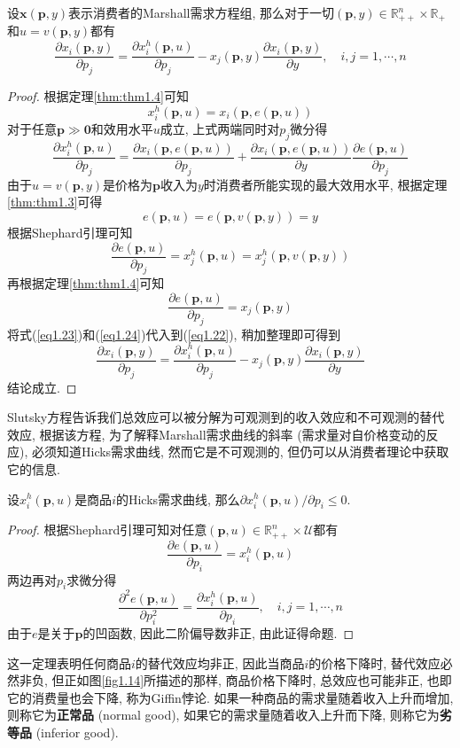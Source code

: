 \documentclass[cn, 12pt, math=mtpro2, bibstyle=apa, blue]{elegantbook}
\newcommand{\R}{\mathbb{R}}
\newcommand{\p}{\mathbf{p}}
\newcommand{\x}{\mathbf{x}}
\begin{document}
\begin{theorem}[Slutsky方程]
  设$\x(\p,y)$表示消费者的Marshall需求方程组, 那么对于一切$(\p,y)\in\R_{++}^n\times\R_+$和$u=v(\p,y)$都有
  $$\frac{\partial x_i(\p,y)}{\partial p_j}=\frac{\partial x_i^h(\p,u)}{\partial p_j}-x_j(\p,y)\frac{\partial x_i(\p,y)}{\partial y},\quad i,j=1,\cdots,n$$
\end{theorem}
\begin{proof}
  根据定理\ref{thm:thm1.4}可知
  $$x_i^h(\p,u)=x_i(\p,e(\p,u))$$
  对于任意$\p\gg\mathbf{0}$和效用水平$u$成立, 上式两端同时对$p_j$微分得
  \begin{equation}\label{eq1.22}
    \frac{\partial x_i^h(\p,u)}{\partial p_j}=\frac{\partial x_i(\p,e(\p,u))}{\partial p_j}+\frac{\partial x_i(\p,e(\p,u))}{\partial y}\frac{\partial e(\p,u)}{\partial p_j}
  \end{equation}
  由于$u=v(\p,y)$是价格为$\p$收入为$y$时消费者所能实现的最大效用水平, 根据定理\ref{thm:thm1.3}可得
  \begin{equation}\label{eq1.23}
    e(\p,u)=e(\p,v(\p,y))=y
  \end{equation}
  根据Shephard引理可知
  $$\frac{\partial e(\p,u)}{\partial p_j}=x_j^h(\p,u)=x_j^h(\p,v(\p,y))$$
  再根据定理\ref{thm:thm1.4}可知
  \begin{equation}\label{eq1.24}
    \frac{\partial e(\p,u)}{\partial p_j}=x_j(\p,y)
  \end{equation}
  将式(\ref{eq1.23})和(\ref{eq1.24})代入到(\ref{eq1.22}), 稍加整理即可得到
  $$\frac{\partial x_i(\p,y)}{\partial p_j}=\frac{\partial x_i^h(\p,u)}{\partial p_j}-x_j(\p,y)\frac{\partial x_i(\p,y)}{\partial y}$$
  结论成立.
\end{proof}

Slutsky方程告诉我们总效应可以被分解为可观测到的收入效应和不可观测的替代效应, 根据该方程, 为了解释Marshall需求曲线的斜率 (需求量对自价格变动的反应), 必须知道Hicks需求曲线, 然而它是不可观测的, 但仍可以从消费者理论中获取它的信息.

\begin{theorem}
  设$x_i^h(\p,u)$是商品$i$的Hicks需求曲线, 那么$\partial x_i^h(\p,u)/\partial p_i\le0$.
\end{theorem}
\begin{proof}
  根据Shephard引理可知对任意$(\p,u)\in\R_{++}^n\times\mathcal{U}$都有
  $$\frac{\partial e(\p,u)}{\partial p_i}=x_i^h(\p,u)$$
  两边再对$p_i$求微分得
  $$\frac{\partial^2e(\p,u)}{\partial p_i^2}=\frac{\partial x_i^h(\p,u)}{\partial p_i},\quad i,j=1,\cdots,n$$
  由于$e$是关于$\p$的凹函数, 因此二阶偏导数非正, 由此证得命题.
\end{proof}
这一定理表明任何商品$i$的替代效应均非正, 因此当商品$i$的价格下降时, 替代效应必然非负, 但正如图\ref{fig1.14}所描述的那样, 商品价格下降时, 总效应也可能非正, 也即它的消费量也会下降, 称为Giffin悖论. 如果一种商品的需求量随着收入上升而增加, 则称它为\textbf{正常品} (normal good), 如果它的需求量随着收入上升而下降, 则称它为\textbf{劣等品} (inferior good).
\end{document}
